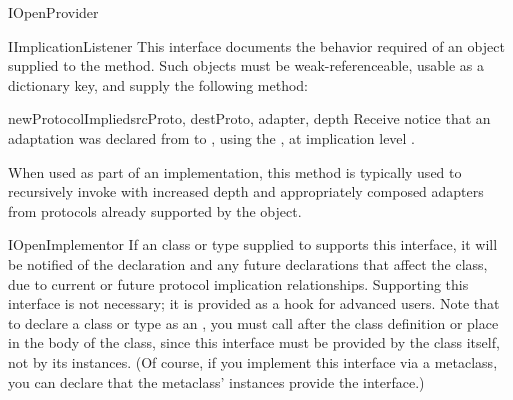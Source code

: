 \begin{verbatim%
}
\begin{verbatim%
}
\begin{verbatim%
}
\begin{verbatim%
}
\begin{classdesc*}{IOpenProvider}
\end{classdesc*}

















\begin{classdesc*}{IImplicationListener}
This interface documents the behavior required of an object supplied to
the  method.  Such objects must
be weak-referenceable, usable as a dictionary key, and supply the following
method:

\begin{methoddesc}{newProtocolImplied}{srcProto, destProto, adapter, depth}
Receive notice that an adaptation was declared from  to
, using the  , at
implication level .

When used as part of an  implementation, this method is
typically used to recursively invoke  with
increased depth and appropriately composed adapters from protocols already
supported by the object.
\end{methoddesc}

\end{classdesc*}























\begin{classdesc*}{IOpenImplementor}
If an class or type supplied to  supports
this interface, it will be notified of the declaration and any future
declarations that affect the class, due to current or future protocol
implication relationships.  Supporting this interface is not necessary; it is
provided as a hook for advanced users.  Note that to declare a class or type
as an , you must call  after the class definition or place
 in the body of the class, since
this interface must be provided by the class itself, not by its instances.  (Of
course, if you implement this interface via a metaclass, you can declare that
the metaclass' instances provide the interface.)


\end{classdesc*}
\end{verbatim%
}
\end{verbatim%
}
\end{verbatim%
}
\end{verbatim%
}
